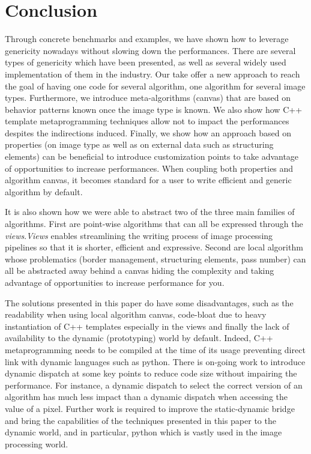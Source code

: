 \chapter{Conclusion}
\label{chap:conclusion}

Through concrete benchmarks and examples, we have shown how to leverage genericity nowadays without slowing down the
performances. There are several types of genericity which have been presented, as well as several widely used
implementation of them in the industry. Our take offer a new approach to reach the goal of having one code for several
algorithm, one algorithm for several image types. Furthermore, we introduce meta-algorithms (canvas) that are based on
behavior patterns known once the image type is known. We also show how C++ template metaprogramming techniques allow not
to impact the performances despites the indirections induced. Finally, we show how an approach based on properties (on
image type as well as on external data such as structuring elements) can be beneficial to introduce customization points
to take advantage of opportunities to increase performances. When coupling both properties and algorithm canvas, it
becomes standard for a user to write efficient and generic algorithm by default.

It is also shown how we were able to abstract two of the three main families of algorithms. First are point-wise
algorithms that can all be expressed through the \emph{views}.\emph{Views} enables streamlining the writing process of
image processing pipelines so that it is shorter, efficient and expressive. Second are local algorithm whose
problematics (border management, structuring elements, pass number) can all be abstracted away behind a canvas hiding
the complexity and taking advantage of opportunities to increase performance for you.

The solutions presented in this paper do have some disadvantages, such as the readability when using local algorithm
canvas, code-bloat due to heavy instantiation of C++ templates especially in the views and finally the lack of
availability to the dynamic (prototyping) world by default. Indeed, C++ metaprogramming needs to be compiled at the time
of its usage preventing direct link with dynamic languages such as python. There is on-going work to introduce dynamic
dispatch at some key points to reduce code size without impairing the performance. For instance, a dynamic dispatch to
select the correct version of an algorithm has much less impact than a dynamic dispatch when accessing the value of a
pixel. Further work is required to improve the static-dynamic bridge and bring the capabilities of the techniques
presented in this paper to the dynamic world, and in particular, python which is vastly used in the image processing
world.

